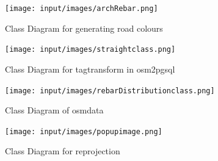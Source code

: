 \begin{figure}
    \centering
    \texttt{[image: input/images/archRebar.png]}
    \caption{Class Diagram for generating road colours}
    \label{fig:collaborative1}
\end{figure}

\begin{figure}
    \centering
    \texttt{[image: input/images/straightclass.png]}
    \caption{Class Diagram for tagtransform in osm2pgsql}
    \label{fig:collaborative}
\end{figure}

\begin{figure}
\centering
\texttt{[image: input/images/rebarDistributionclass.png]}
\caption{Class Diagram of osmdata}
\label{fig:classAnnotation__coll__graph}
\end{figure}

\begin{figure}
\centering
\texttt{[image: input/images/popupimage.png]}
\caption{Class Diagram for reprojection}
\label{fig:classAnnotation__coll__graphh}
\end{figure}
